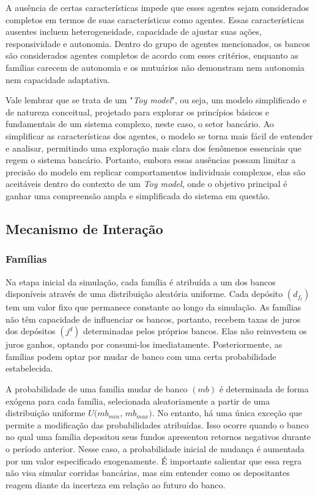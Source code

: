 \documentclass[hidelinks, article,12pt,oneside,a4paper,english,brazil,sumario=tradicional]{abntex2}
\begin{document}
A ausência de certas características impede que esses agentes sejam considerados completos em termos de suas características como agentes. Essas características ausentes incluem heterogeneidade, capacidade de ajustar suas ações, responsividade e autonomia. Dentro do grupo de agentes mencionados, os bancos são considerados agentes completos de acordo com esses critérios, enquanto as famílias carecem de autonomia e os mutuários não demonstram nem autonomia nem capacidade adaptativa.

Vale lembrar que se trata de um "\textit{Toy model}", ou seja, um modelo simplificado e de natureza conceitual, projetado para explorar os princípios básicos e fundamentais de um sistema complexo, neste caso, o setor bancário. Ao simplificar as características dos agentes, o modelo se torna mais fácil de entender e analisar, permitindo uma exploração mais clara dos fenômenos essenciais que regem o sistema bancário. Portanto, embora essas ausências possam limitar a precisão do modelo em replicar comportamentos individuais complexos, elas são aceitáveis dentro do contexto de um \textit{Toy model}, onde o objetivo principal é ganhar uma compreensão ampla e simplificada do sistema em questão.

\subsection{Mecanismo de Interação}

\subsubsection{Famílias}


Na etapa inicial da simulação, cada família é atribuída a um dos bancos disponíveis através de uma distribuição aleatória uniforme. Cada depósito $(d_{f_{t}})$ tem um valor fixo que permanece constante ao longo da simulação. As famílias não têm capacidade de influenciar os bancos, portanto, recebem taxas de juros dos depósitos $(j^{d})$ determinadas pelos próprios bancos. Elas não reinvestem os juros ganhos, optando por consumi-los imediatamente. Posteriormente, as famílias podem optar por mudar de banco com uma certa probabilidade estabelecida.

A probabilidade de uma família mudar de banco $(mb)$ é determinada de forma exógena para cada família, selecionada aleatoriamente a partir de uma distribuição uniforme $U(mb_{min}$, $mb_{max})$. No entanto, há uma única exceção que permite a modificação das probabilidades atribuídas. Isso ocorre quando o banco no qual uma família depositou seus fundos apresentou retornos negativos durante o período anterior. Nesse caso, a probabilidade inicial de mudança é aumentada por um valor especificado exogenamente. É importante salientar que essa regra não visa simular corridas bancárias, mas sim entender como os depositantes reagem diante da incerteza em relação ao futuro do banco.
\end{document}
